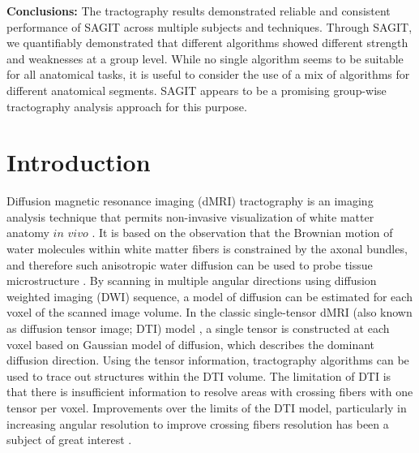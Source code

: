 \textbf{Conclusions:} The tractography results demonstrated reliable and consistent performance of SAGIT across multiple subjects and techniques. Through SAGIT, we quantifiably demonstrated that different algorithms showed different strength and weaknesses at a group level. While no single algorithm seems to be suitable for all anatomical tasks, it is useful to consider the use of a mix of algorithms for different anatomical segments. SAGIT appears to be a promising group-wise tractography analysis approach for this purpose.

\section{Introduction}

Diffusion magnetic resonance imaging (dMRI) tractography is an imaging analysis technique that permits non-invasive visualization of white matter anatomy $in$ $vivo$ \cite{Basser2000}.  It is based on the observation that the Brownian motion of water molecules within white matter fibers is constrained by the axonal bundles, and therefore such anisotropic water diffusion can be used to probe tissue microstructure \cite{Bihan2001a}. By scanning in multiple angular directions using diffusion weighted imaging (DWI) sequence, a model of diffusion can be estimated for each voxel of the scanned image volume. 
In the classic single-tensor dMRI (also known as diffusion tensor image; DTI) model \cite{Basser2002}, a single tensor is constructed at each voxel based on Gaussian model of diffusion, which describes the dominant diffusion direction. Using the tensor information, tractography algorithms \cite{Mori2002b} can be used to trace out structures within the DTI volume. The limitation of DTI is that there is insufficient information to resolve areas with crossing fibers with one tensor per voxel. Improvements over the limits of the DTI model, particularly in increasing angular resolution to improve crossing fibers resolution has been a subject of great interest \cite{Fritzsche2010d,Jeurissen2012d,Tuch2002f}.

